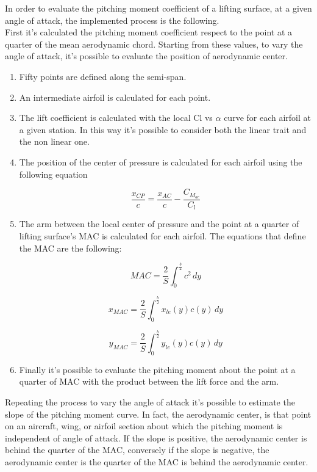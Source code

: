 In order to evaluate the pitching moment coefficient of a lifting surface, at a given angle of attack, the implemented process is the following.\\
First it's calculated the pitching moment coefficient respect to the point at a quarter of the mean aerodynamic chord. Starting from these values, to vary the angle of attack, it's possible to evaluate the position of aerodynamic center.

\begin{enumerate}

\item Fifty points are defined along the semi-span.
\item An intermediate airfoil is calculated for each point.
\item The lift coefficient is calculated with the local Cl vs  $\alpha$ curve for each airfoil at a given station. In this way it’s possible to consider both the linear trait and the non linear one.
\item The position of the center of pressure is calculated for each airfoil using the following equation

\begin {equation}
\frac{x_{CP}}{c} = \frac{x_{AC}}{c} - \frac{C_{M_{ac}}}{C_l}
\end{equation}

\item The arm between the local center of pressure and the point at a quarter of lifting surface’s MAC is calculated for each airfoil. The equations that define the MAC are the following:

\begin{equation}
MAC=\frac{2}{S} \int_{0}^{\frac{b}{2}} c^2\, dy
\end{equation}

\begin{equation}
x_{MAC}=\frac{2}{S} \int_{0}^{\frac{b}{2}}x_{le}(y) c(y)\, dy
\end{equation}

\begin{equation}
y_{MAC}=\frac{2}{S} \int_{0}^{\frac{b}{2}}y_{le}(y) c(y)\, dy
\end{equation}

\item Finally it’s possible to evaluate the pitching moment about the point at a quarter of MAC with the product between the lift force and the arm.
\end{enumerate}


Repeating the process to vary the angle of attack it's possible to estimate the slope of the pitching moment curve.  In fact, the aerodynamic center, is that point on an aircraft, wing, or airfoil section about which the pitching moment is independent of angle of attack.
If the slope is positive, the aerodynamic center is behind the quarter of the MAC, conversely if the slope is negative, the aerodynamic center is the quarter of the MAC is behind the aerodynamic center.

